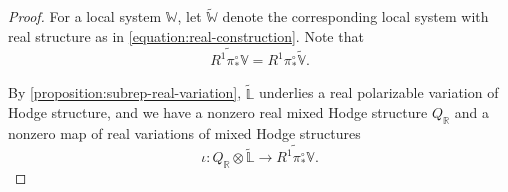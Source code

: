\begin{proof}
For a local system $\mathbb W$, let $\widetilde{\mathbb W}$ denote the
corresponding local system with real structure as in
\eqref{equation:real-construction}. Note that $$\widetilde{R^1 \pi^\circ_* \mathbb{V}}=R^1 \pi^\circ_* \widetilde{\mathbb{V}}.$$

By \autoref{proposition:subrep-real-variation}, $\widetilde{\mathbb{L}}$
underlies a real polarizable variation of Hodge structure, and we have a
nonzero real mixed Hodge structure $Q_{\mathbb R}$ and a nonzero map of real
variations of mixed Hodge structures
$$\iota: Q_{\mathbb R} \otimes \widetilde{\mathbb L} \to \widetilde{R^1 \pi^\circ_* \mathbb V}.$$
%
%

\end{proof}
